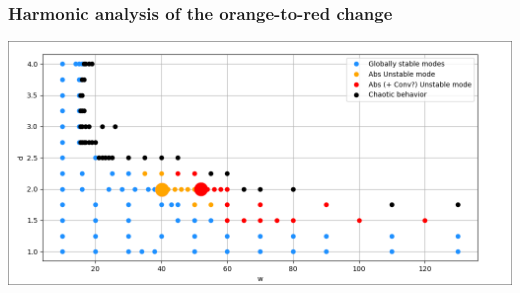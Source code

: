 \documentclass[
  aspectratio=169, %
  t, %
  onlytextwidth, %
  10pt, %
]{beamer}
\begin{document}
\begin{frame}
	\frametitle{Harmonic analysis of the orange-to-red change}
	\centering
	\includegraphics[width=0.75\linewidth]{Images/stability_curve.png}
\end{frame}
\end{document}
